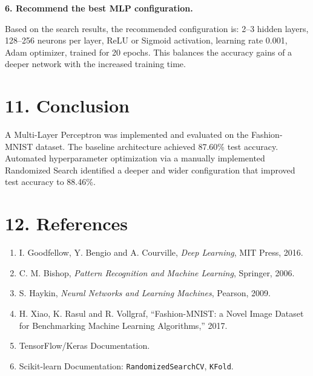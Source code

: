 \documentclass[11pt]{article}
\begin{document}
\textbf{6. Recommend the best MLP configuration.}

Based on the search results, the recommended configuration is: 2--3 hidden layers, 128--256 neurons per layer, ReLU or Sigmoid activation, learning rate 0.001, Adam optimizer, trained for 20 epochs. This balances the accuracy gains of a deeper network with the increased training time.



\section*{11. Conclusion}

A Multi-Layer Perceptron was implemented and evaluated on the Fashion-MNIST dataset. The baseline architecture achieved 87.60\% test accuracy. Automated hyperparameter optimization via a manually implemented Randomized Search identified a deeper and wider configuration that improved test accuracy to 88.46\%. 


\section*{12. References}

\begin{enumerate}
\item I. Goodfellow, Y. Bengio and A. Courville, \emph{Deep Learning}, MIT Press, 2016.
\item C. M. Bishop, \emph{Pattern Recognition and Machine Learning}, Springer, 2006.
\item S. Haykin, \emph{Neural Networks and Learning Machines}, Pearson, 2009.
\item H. Xiao, K. Rasul and R. Vollgraf, ``Fashion-MNIST: a Novel Image Dataset for Benchmarking Machine Learning Algorithms,'' 2017.
\item TensorFlow/Keras Documentation.
\item Scikit-learn Documentation: \texttt{RandomizedSearchCV}, \texttt{KFold}.
\end{enumerate}
\end{document}
